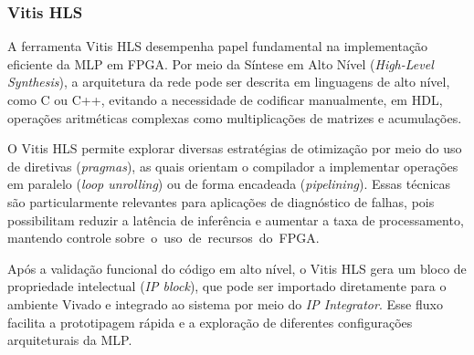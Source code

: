 \subsubsection*{Vitis HLS}

A ferramenta Vitis HLS desempenha papel fundamental na implementação eficiente
da MLP em FPGA. Por meio da Síntese em Alto Nível (\textit{High-Level Synthesis}),
a arquitetura da rede pode ser descrita em linguagens de alto nível, como C ou
C++, evitando a necessidade de codificar manualmente, em HDL, operações
aritméticas complexas como multiplicações de matrizes e acumulações.

O Vitis HLS permite explorar diversas estratégias de otimização por meio do uso
de diretivas (\textit{pragmas}), as quais orientam o compilador a implementar
operações em paralelo (\textit{loop unrolling}) ou de forma encadeada
(\textit{pipelining}). Essas técnicas são particularmente relevantes para
aplicações de diagnóstico de falhas, pois possibilitam reduzir a latência de
inferência e aumentar a taxa de processamento, mantendo controle \mbox{sobre o uso de
recursos do FPGA.}

Após a validação funcional do código em alto nível, o Vitis HLS gera um bloco de
propriedade intelectual (\textit{IP block}), que pode ser importado diretamente
para o ambiente Vivado e integrado ao sistema por meio do \textit{IP Integrator}.
Esse fluxo facilita a prototipagem rápida e a exploração de diferentes
configurações arquiteturais da MLP.

%
%
%


